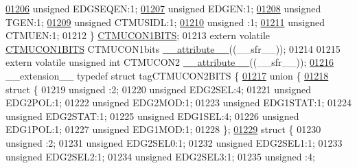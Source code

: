 \begin{DoxyCode}
\hypertarget{a00009_source_l01206}{}\hyperlink{a00008_aa05e0f03474daa69c3c9645bc5a0e8c2}{01206}   \textcolor{keywordtype}{unsigned} EDGSEQEN:1;
\hypertarget{a00009_source_l01207}{}\hyperlink{a00008_a6afa77037e4707f3a9838a2947dd502b}{01207}   \textcolor{keywordtype}{unsigned} EDGEN:1;
\hypertarget{a00009_source_l01208}{}\hyperlink{a00008_aaddfea02079b3d2db63b9eba724d521b}{01208}   \textcolor{keywordtype}{unsigned} TGEN:1;
\hypertarget{a00009_source_l01209}{}\hyperlink{a00008_a7ec560e3a5238e51f600c0fa5b2bb750}{01209}   \textcolor{keywordtype}{unsigned} CTMUSIDL:1;
\hypertarget{a00009_source_l01210}{}\hyperlink{a00008_acaf2d0924a107ec6e8d2e31febaf66f9}{01210}   \textcolor{keywordtype}{unsigned} :1;
\hypertarget{a00009_source_l01211}{}\hyperlink{a00008_acb81a973fd79e1167fab526beadf624d}{01211}   \textcolor{keywordtype}{unsigned} CTMUEN:1;
01212 \} \hyperlink{a00008_d4/def/a00359}{CTMUCON1BITS};
01213 \textcolor{keyword}{extern} \textcolor{keyword}{volatile} \hyperlink{a00008_d4/def/a00359}{CTMUCON1BITS} CTMUCON1bits \hyperlink{a00009_a493c46f03454991ccc5aa7a6e1dfb2a7}{\_\_attribute\_\_}((\_\_sfr\_\_));
01214 
01215 \textcolor{keyword}{extern} \textcolor{keyword}{volatile} \textcolor{keywordtype}{unsigned} \textcolor{keywordtype}{int}  CTMUCON2 \hyperlink{a00009_a493c46f03454991ccc5aa7a6e1dfb2a7}{\_\_attribute\_\_}((\_\_sfr\_\_));
\hypertarget{a00009_source_l01216}{}\hyperlink{a00008}{01216} \_\_extension\_\_ \textcolor{keyword}{typedef} \textcolor{keyword}{struct }tagCTMUCON2BITS \{
\hypertarget{a00009_source_l01217}{}\hyperlink{a00009}{01217}   \textcolor{keyword}{union }\{
\hypertarget{a00009_source_l01218}{}\hyperlink{a00009}{01218}     \textcolor{keyword}{struct }\{
01219       \textcolor{keywordtype}{unsigned} :2;
01220       \textcolor{keywordtype}{unsigned} EDG2SEL:4;
01221       \textcolor{keywordtype}{unsigned} EDG2POL:1;
01222       \textcolor{keywordtype}{unsigned} EDG2MOD:1;
01223       \textcolor{keywordtype}{unsigned} EDG1STAT:1;
01224       \textcolor{keywordtype}{unsigned} EDG2STAT:1;
01225       \textcolor{keywordtype}{unsigned} EDG1SEL:4;
01226       \textcolor{keywordtype}{unsigned} EDG1POL:1;
01227       \textcolor{keywordtype}{unsigned} EDG1MOD:1;
01228     \};
\hypertarget{a00009_source_l01229}{}\hyperlink{a00009}{01229}     \textcolor{keyword}{struct }\{
01230       \textcolor{keywordtype}{unsigned} :2;
01231       \textcolor{keywordtype}{unsigned} EDG2SEL0:1;
01232       \textcolor{keywordtype}{unsigned} EDG2SEL1:1;
01233       \textcolor{keywordtype}{unsigned} EDG2SEL2:1;
01234       \textcolor{keywordtype}{unsigned} EDG2SEL3:1;
01235       \textcolor{keywordtype}{unsigned} :4;

\end{DoxyCode}
